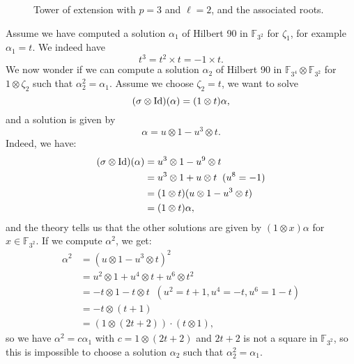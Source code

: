 \documentclass[a4paper,11pt]{article}
\begin{document}
\begin{figure}
  \centering
{}
\phantom{and}
  \caption{Tower of extension with $p=3$ and $\ell=2$, and the associated roots.}
  \label{fig:p3l2}
\end{figure}



Assume we have computed a solution $\alpha_1$ of Hilbert 90 in $\mathbb{F}_{3^2}$ for
$\zeta_1$, for example $\alpha_1=t$. We indeed have
\[
  t^3 = t^2\times t=-1\times t.
\]
We now wonder if we can compute a solution $\alpha_2$ of Hilbert 90 in
$\mathbb{F}_{3^4}\otimes\mathbb{F}_{3^2}$ for $1\otimes\zeta_2$ such
that $\alpha_2^2=\alpha_1$. Assume we choose $\zeta_2=t$, we want to solve
\[
  (\sigma\otimes\operatorname{Id})(\alpha) = (1\otimes t)\alpha,
\]
and a solution is given by 
\[
  \alpha = u\otimes1-u^3\otimes t.
\]
Indeed, we have:
\begin{align*}
  (\sigma\otimes\operatorname{Id})(\alpha) &= u^3\otimes1-u^9\otimes t \\
  &= u^3\otimes 1+u\otimes t \;\;(u^8 = -1)\\
  &= (1\otimes t)(u\otimes1-u^3\otimes t) \\
  &= (1\otimes t)\alpha,
\end{align*}
and the theory tells us that the other solutions are given by $(1\otimes
x)\alpha$ for $x\in\mathbb{F}_{3^2}$. If we compute $\alpha^2$, we get:
\begin{align*}
\alpha^2 &= (u\otimes1-u^3\otimes t)^2 \\
&= u^2\otimes 1 + u^4\otimes t + u^6\otimes t^2 \\
&= -t\otimes 1 - t\otimes t\;\;(u^2=t+1, u^4=-t, u^6=1-t)\\
&= -t\otimes (t+1) \\
&= (1\otimes (2t+2))\cdot(t\otimes 1),
\end{align*}
so we have $\alpha^2=c\alpha_1$ with $c=1\otimes (2t+2)$ and $2t+2$ is not a
square in $\mathbb{F}_{3^2}$, so this is impossible to choose a solution
$\alpha_2$ such that $\alpha_2^2=\alpha_1$.
\end{document}
